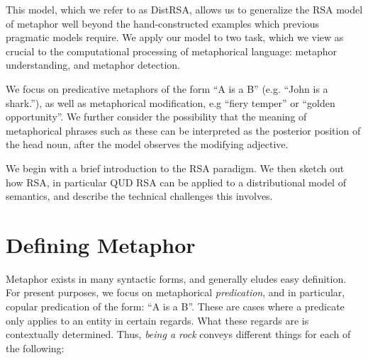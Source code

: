 \documentclass[10pt,letterpaper,twocolumn]{article}
\begin{document}

This model, which we refer to as DistRSA, allows us to generalize the RSA model of metaphor well beyond the hand-constructed examples which previous pragmatic models require. We apply our model to two task, which we view as crucial to the computational processing of metaphorical language: metaphor understanding, and metaphor detection.





We focus on predicative metaphors of the form ``A is a B'' (e.g. ``John is a shark.''), as well as metaphorical modification, e.g ``fiery temper'' or ``golden opportunity''. We further consider the possibility that the meaning of metaphorical phrases such as these can be interpreted as the posterior position of the head noun, after the model observes the modifying adjective.

We begin with a brief introduction to the RSA paradigm. We then sketch out how RSA, in particular QUD RSA can be applied to a distributional model of semantics, and describe the technical challenges this involves.

\section{Defining Metaphor}


Metaphor exists in many syntactic forms, and generally eludes easy definition. For present purposes, we focus on metaphorical \emph{predication}, and in particular, copular predication of the form: ``A is a B''. These are cases where a predicate only applies to an entity in certain regards. What these regards are is contextually determined. Thus, \emph{being a rock} conveys different things for each of the following:
\end{document}
